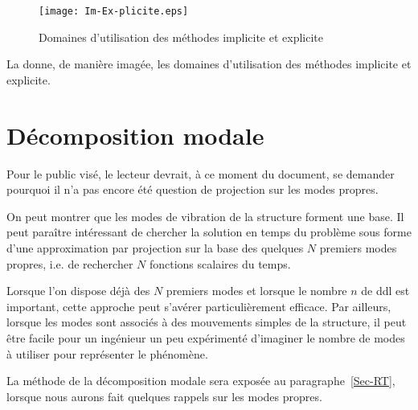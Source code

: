 \medskip
\begin{figure}[ht]
\centering\texttt{[image: Im-Ex-plicite.eps]}
\caption{Domaines d'utilisation des méthodes implicite et explicite}\label{Fig-Im-Ex-plicite}
\end{figure}
La  donne, de manière imagée, les domaines d'utilisation des méthodes implicite et explicite.


\ifVersionAvecExemplesSepares\else
\fi

\bigskip
\section{Décomposition modale}

Pour le public visé, le lecteur devrait, à ce moment du document, se demander pourquoi
il n'a pas encore été question de projection sur les modes propres.

\medskip
On peut montrer que les modes de vibration de la structure forment une base. Il peut
paraître intéressant de chercher la solution en temps du problème sous forme d'une
approximation par projection sur la base des quelques $N$ premiers modes propres, i.e.
de rechercher $N$ fonctions scalaires du temps.

Lorsque l'on dispose déjà des $N$ premiers modes et lorsque le nombre $n$ de ddl est important,
cette approche peut s'avérer particulièrement efficace.
Par ailleurs, lorsque les modes sont associés à des mouvements simples de la structure, il
peut être facile pour un ingénieur un peu expérimenté d'imaginer le nombre de modes à
utiliser pour représenter le phénomène.

\medskip
La méthode de la décomposition modale sera exposée au paragraphe~\ref{Sec-RT}, lorsque
nous aurons fait quelques rappels sur les modes propres.





